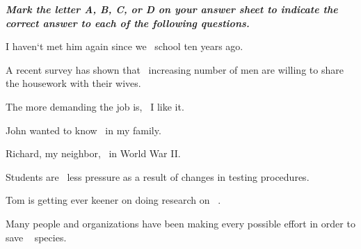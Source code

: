 \documentclass[11pt]{article}
\def\ktrang{\makebox[1.5cm]{\hrulefill}\ }
\begin{document}
\begin{multiplechoice}[rearrange=yes, keycolumns=2]%
\examvspace*{0.7cm}
\textit{\textbf{Mark the letter A, B, C, or D on your answer sheet to indicate the correct answer to each of the
following questions.}}

\begin{question}%
I haven‘t met him again since we \ktrang  school ten years ago.
\datcot
\bonpat
{}
{}
{ }
{}
\end{question}

\begin{question} %
A recent survey has shown that \ktrang increasing number of men are willing to share the
housework with their wives.
\datcot
\bonpat
{ }
{}
{}
{}
\end{question}

\begin{question} %
The more demanding the job is, \ktrang  I like it.
\datcot
\bonpa
{}
{}
{ }
{}
\end{question}

\begin{question} %
John wanted to know \ktrang  in my family.
\datcot[2]
\bonpa
{}
{}
{}
{ }
\end{question}

\begin{question} %
 Richard, my neighbor, \ktrang  in World War II.
\datcot[2]
\bonpa
{}
{}
{}
{}
\end{question}

\begin{question} %
Students are \ktrang  less pressure as a result of changes in testing procedures.
\datcot
\bonpa
{ }
{}
{}
{}
\end{question}

\begin{question} %
Tom is getting ever keener on doing research on \ktrang .
\datcot
\bonpa
{ }
{}
{}
{}
\end{question}

\begin{question} %
Many people and organizations have been making every possible effort in order to save \ktrang 
species.
\datcot
\bonpa
{}
{}
{}
{}
\end{question}


\end{multiplechoice}
\end{document}

